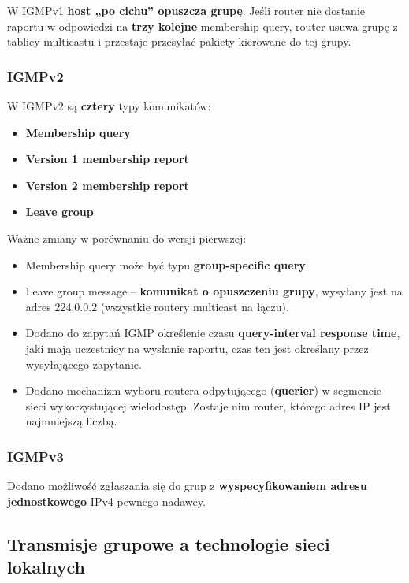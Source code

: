 \documentclass[../main.tex]{subfiles}
\begin{document}
    W IGMPv1 \textbf{host „po cichu” opuszcza grupę}. Jeśli router nie dostanie raportu w odpowiedzi
    na \textbf{trzy kolejne} membership query,
    router usuwa grupę z tablicy multicastu i przestaje przesyłać pakiety kierowane do tej grupy.

    \subsubsection{IGMPv2}

    W IGMPv2 są \textbf{cztery} typy komunikatów:
    \begin{itemize}
        \item \textbf{Membership query}
        \item \textbf{Version 1 membership report}
        \item \textbf{Version 2 membership report}
        \item \textbf{Leave group}
    \end{itemize}


    Ważne zmiany w porównaniu do wersji pierwszej:
    \begin{itemize}
        \item Membership query może być typu \textbf{group-specific query}.
        \item Leave group message – \textbf{komunikat o opuszczeniu grupy}, wysyłany jest na adres
        224.0.0.2 (wszystkie routery multicast na łączu).
        \item Dodano do zapytań IGMP określenie czasu \textbf{query-interval response time}, jaki mają uczestnicy na wysłanie raportu, czas ten jest określany przez
        wysyłającego zapytanie.
        \item Dodano mechanizm wyboru routera odpytującego (\textbf{querier}) w segmencie sieci
        wykorzystującej wielodostęp. Zostaje nim router, którego adres IP jest najmniejszą
        liczbą.
    \end{itemize}

    \subsubsection{IGMPv3}

    Dodano możliwość zgłaszania się do grup z \textbf{wyspecyfikowaniem adresu
    jednostkowego} IPv4 pewnego nadawcy.


    \subsection{Transmisje grupowe a technologie sieci lokalnych}
\end{document}
